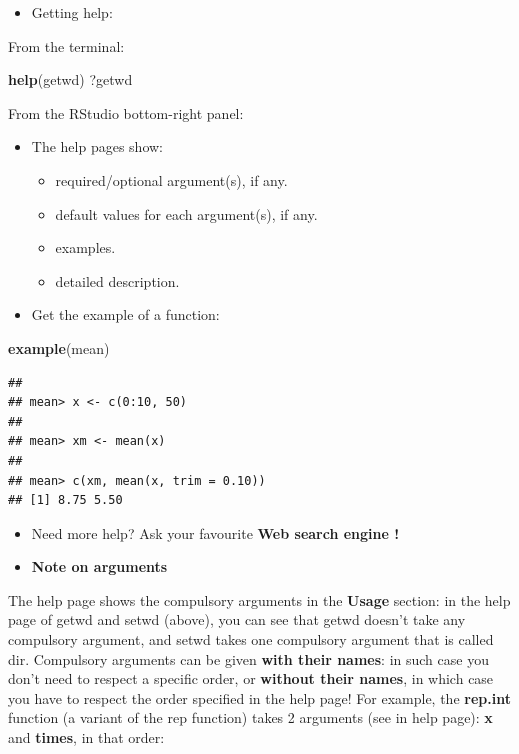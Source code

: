 \documentclass[]{book}
\newenvironment{Shaded}{\begin{snugshade}}{\end{snugshade}}
\newcommand{\KeywordTok}[1]{\textcolor[rgb]{0.13,0.29,0.53}{\textbf{#1}}}
\newcommand{\NormalTok}[1]{#1}
\providecommand{\tightlist}{%
  \setlength{\itemsep}{0pt}\setlength{\parskip}{0pt}}
\begin{document}
\begin{itemize}
\tightlist
\item
  Getting help: 
\end{itemize}

From the terminal:

\begin{Shaded}
\begin{Highlighting}[]
\KeywordTok{help}\NormalTok{(getwd)}
\NormalTok{?getwd}
\end{Highlighting}
\end{Shaded}

From the RStudio bottom-right panel:

\begin{itemize}
\tightlist
\item
  The help pages show:

  \begin{itemize}
  \tightlist
  \item
    required/optional argument(s), if any.
  \item
    default values for each argument(s), if any.
  \item
    examples.
  \item
    detailed description.
  \end{itemize}
\item
  Get the example of a function:
\end{itemize}

\begin{Shaded}
\begin{Highlighting}[]
\KeywordTok{example}\NormalTok{(mean)}
\end{Highlighting}
\end{Shaded}

\begin{verbatim}
## 
## mean> x <- c(0:10, 50)
## 
## mean> xm <- mean(x)
## 
## mean> c(xm, mean(x, trim = 0.10))
## [1] 8.75 5.50
\end{verbatim}

\begin{itemize}
\item
  Need more help? Ask your favourite \textbf{Web search engine !}
\item
  \textbf{Note on arguments}
\end{itemize}

The help page shows the compulsory arguments in the \textbf{Usage} section: in the help page of getwd and setwd (above), you can see that getwd doesn't take any compulsory argument, and setwd takes one compulsory argument that is called dir.
Compulsory arguments can be given \textbf{with their names}: in such case you don't need to respect a specific order, or \textbf{without their names}, in which case you have to respect the order specified in the help page!
For example, the \textbf{rep.int} function (a variant of the rep function) takes 2 arguments (see in help page): \textbf{x} and \textbf{times}, in that order:
\end{document}
